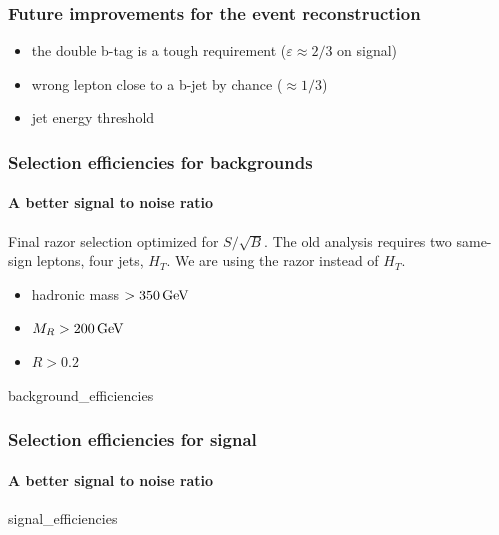 \documentclass[ukenglish]{beamer}
\begin{document}
\begin{frame}
    \frametitle{Future improvements for the event reconstruction}
    \begin{itemize}
        \item the double b-tag is a tough requirement ($\varepsilon \approx 2/3$ on signal)
        \item wrong lepton close to a b-jet by chance ($\approx 1/3$)
        \item jet energy threshold
    \end{itemize}
\end{frame}

\begin{frame}
    \frametitle{Selection efficiencies for backgrounds}
    \framesubtitle{A better signal to noise ratio}
    Final razor selection optimized for $S/\sqrt{B}$. The old analysis
    requires two same-sign leptons, four jets, $H_T$. We are using the razor
    instead of $H_T$.
    \begin{itemize}
        \item hadronic mass $>\unit[350]{GeV}$
        \item $M_R > \unit[200]{GeV}$
        \item $R > 0.2$
    \end{itemize}
    {background_efficiencies}
\end{frame}

\begin{frame}
    \frametitle{Selection efficiencies for signal}
    \framesubtitle{A better signal to noise ratio}
    {signal_efficiencies}
\end{frame}
\end{document}
